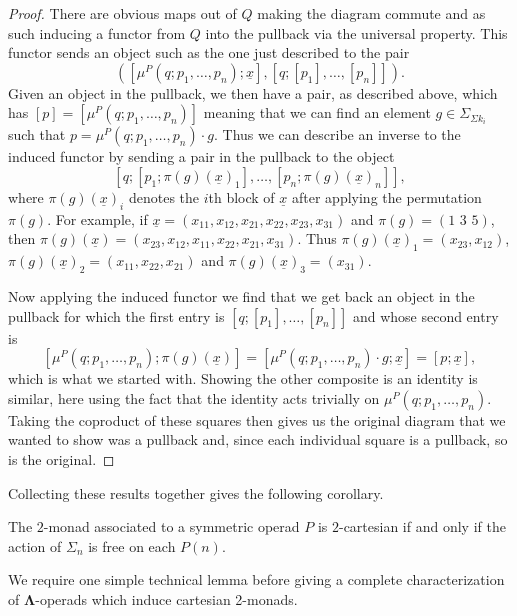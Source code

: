 \documentclass{amsbook} %
\newcommand{\ML}{\mathbf{\Lambda}}
\numberwithin{section}{chapter}
\begin{document}
\begin{proof}
There are obvious maps out of $Q$ making the diagram commute and as such inducing a functor from $Q$ into the pullback via the universal property. This functor sends an object such as the one just described to the pair
    \[
        \left(\left[\mu^P(q;p_1,\ldots,p_n);\underline{x}\right], [q;[p_1],\ldots,[p_n]]\right).
    \]
Given an object in the pullback, we then have a pair, as described above, which has $[p] = [\mu^P(q;p_1,\ldots,p_n)]$ meaning that we can find an element $g \in \Sigma_{\Sigma k_i}$ such that $p  = \mu^P(q;p_1,\ldots,p_n) \cdot g$. Thus we can describe an inverse to the induced functor by sending a pair in the pullback to the object
    \[
        [q;[p_1;\pi(g)(\underline{x})_1],\ldots,[p_n;\pi(g)(\underline{x})_n]],
    \]
where $\pi(g)(\underline{x})_i$ denotes the $i$th block of $\underline{x}$ after applying the permutation $\pi(g)$. For example, if $\underline{x} = (x_{11}, x_{12}, x_{21}, x_{22}, x_{23}, x_{31})$ and $\pi(g) = (1\, \, 3 \, \, 5)$, then $\pi(g)(\underline{x}) = (x_{23}, x_{12}, x_{11}, x_{22}, x_{21}, x_{31})$. Thus $\pi(g)(\underline{x})_1 = (x_{23}, x_{12})$, $\pi(g)(\underline{x})_2 = (x_{11}, x_{22}, x_{21})$ and $\pi(g)(\underline{x})_3 = (x_{31})$.

Now applying the induced functor we find that we get back an object in the pullback for which the first entry is $[q;[p_1],\ldots,[p_n]]$ and whose second entry is
    \[
       \left[\mu^P(q;p_1,\ldots,p_n);\pi(g)(\underline{x})\right] = \left[\mu^P(q;p_1,\ldots,p_n) \cdot g;\underline{x}\right] = [p;\underline{x}],
    \]
which is what we started with. Showing the other composite is an identity is similar, here using the fact that the identity acts trivially on $\mu^P(q;p_1,\ldots,p_n)$. Taking the coproduct of these squares then gives us the original diagram that we wanted to show was a pullback and, since each individual square is a pullback, so is the original.
\end{proof}

Collecting these results together gives the following corollary.

\begin{cor}\label{cart_cor}
The $2$-monad associated to a symmetric operad $P$ is $2$-cartesian if and only if the action of $\Sigma_n$ is free on each $P(n)$.
\end{cor}

We require one simple technical lemma before giving a complete characterization of $\ML$-operads which induce cartesian 2-monads.
\end{document}
